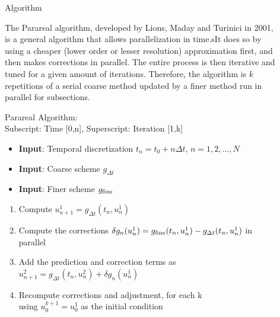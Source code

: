 \documentclass[final]{beamer}
\newlength{\sepwid}
\newlength{\onecolwid}
\begin{document}
\begin{frame}[t]
\begin{columns}[t]
\begin{column}{\onecolwid}
\begin{block}{Algorithm}

The Parareal algorithm, developed by Lions, Maday and Turinici in 2001, is
a general algorithm that allows parallelization in time.sIt does so by using a
cheaper (lower order or lesser resolution) approximation first, and then makes
corrections in parallel. The entire process is then iterative and tuned for a
given amount of iterations. Therefore, the algorithm is $k$ repetitions of a
serial coarse method updated by a finer method run in parallel for subsections.

Parareal Algorithm:\\
Subscript: Time [0,n], Superscript: Iteration [1,k]
\begin{itemize}
    \item \textbf{Input}: Temporal discretization $t_n = t_0 + n \Delta t, \, n =
        1,2,\ldots,N$
    \item \textbf{Input}: Coarse scheme $g_{\Delta t}$
    \item \textbf{Input}: Finer scheme $g_{\textnormal{fine}}$
\end{itemize}

\begin{enumerate}
    \item Compute $u^1_{n+1} = g_{\Delta t}(t_n, u^1_n)$
    \item Compute the corrections $\delta g_n(u^1_n) =
        g_{\textnormal{fine}}(t_n, u^1_n) - g_{\Delta t}(t_n, u^1_n)$ in parallel
    \item Add the prediction and correction terms as $u^2_{n+1} = g_{\Delta
        t}(t_n, u^2_n) + \delta g_n(u^1_n)$
    \item Recompute corrections and adjustment, for each k \\ using
        $u^{k+1}_0 = u^1_0$ as the initial condition
\end{enumerate}
\end{block}



\end{column} %

\begin{column}{\sepwid}\end{column} %

\begin{column}{\onecolwid} %


\end{column}
\end{columns}
\end{frame}
\end{document}
